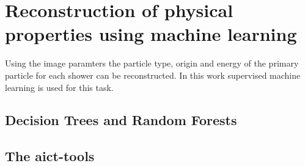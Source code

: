 \chapter{Reconstruction of physical properties using machine learning}
\label{ch:ml}
Using the image paramters the particle type, origin and energy of the primary particle for each shower can be reconstructed.
In this work supervised machine learning is used for this task.

\section{Decision Trees and Random Forests}


\section{The aict-tools}
